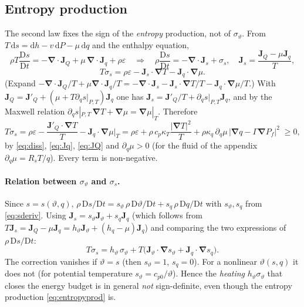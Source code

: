 \documentclass[11pt,a4paper]{article}
\newcommand{\vt}{\vartheta}                    %
\newcommand{\hth}{{h_{\vartheta}}}               %
\newcommand{\hq}{{h_q}}                          %
\newcommand{\bJ}{\mathbf{J}}
\newcommand{\bnabla}{\boldsymbol{\nabla}}
\begin{document}
\subsection{Entropy production}\label{sec:entropy}
The second law fixes the sign of the \emph{entropy} production, not of $\sigma_\vt$. From $T\,\mathrm{d}s=\mathrm{d}h-v\,\mathrm{d}P-\mu\,\mathrm{d}q$ and the enthalpy equation,
\begin{equation}
  \rho T\frac{\mathrm{D}s}{\mathrm{D}t}=-\bnabla\!\cdot\bJ_Q+\mu\,\bnabla\!\cdot\bJ_q+\rho\varepsilon
  \quad\Longrightarrow\quad
  \rho\frac{\mathrm{D}s}{\mathrm{D}t}=-\bnabla\!\cdot\bJ_s+\sigma_s,\quad
  \bJ_s=\frac{\bJ_Q-\mu\bJ_q}{T},
\end{equation}
\begin{equation}
  T\sigma_s=\rho\varepsilon-\bJ_s\!\cdot\bnabla T-\bJ_q\!\cdot\bnabla\mu .
\end{equation}
(Expand $-\bnabla\!\cdot\bJ_Q/T+\mu\bnabla\!\cdot\bJ_q/T=-\bnabla\!\cdot\bJ_s-\bJ_s\!\cdot\bnabla T/T-\bJ_q\!\cdot\bnabla\mu/T$.)
With $\bJ_Q=\bJ'_Q+(\mu+T\partial_qs|_{P,T})\bJ_q$ one has $\bJ_s=\bJ'_Q/T+\partial_qs|_{P,T}\bJ_q$, and by the Maxwell relation
$\partial_qs|_{P,T}\,\bnabla T+\bnabla\mu=\bnabla\mu|_T$. Therefore
\begin{equation}
  T\sigma_s=\rho\varepsilon-\frac{\bJ'_Q\!\cdot\bnabla T}{T}-\bJ_q\!\cdot\bnabla\mu|_T
  =\rho\varepsilon+\rho\,c_p\kappa_T\frac{|\bnabla T|^2}{T}+\rho\kappa_q\,\partial_q\mu\,\big|\bnabla q-\Gamma\bnabla P_f\big|^2\;\ge 0,
  \label{eq:entropyprod}
\end{equation}
by \eqref{eq:diss}, \eqref{eq:Jq}, \eqref{eq:JQ} and $\partial_q\mu>0$ (for the fluid of the appendix $\partial_q\mu=R_sT/q$). Every term is non-negative.

\paragraph{Relation between $\sigma_\vt$ and $\sigma_s$.}
Since $s=s(\vt,q)$, $\rho\,\mathrm{D}s/\mathrm{D}t=s_\vt\,\rho\,\mathrm{D}\vt/\mathrm{D}t+s_q\,\rho\,\mathrm{D}q/\mathrm{D}t$ with $s_\vt,s_q$ from \eqref{eq:sderiv}. Using
$\bJ_s=s_\vt\bJ_\vt+s_q\bJ_q$ (which follows from $T\bJ_s=\bJ_Q-\mu\bJ_q=\hth\bJ_\vt+(\hq-\mu)\bJ_q$) and comparing the two expressions of $\rho\,\mathrm{D}s/\mathrm{D}t$:
\begin{equation}
  T\sigma_s=\hth\,\sigma_\vt+T\big(\bJ_\vt\!\cdot\bnabla s_\vt+\bJ_q\!\cdot\bnabla s_q\big).
  \label{eq:sigmarel}
\end{equation}
The correction vanishes if $\vt=s$ (then $s_\vt=1$, $s_q=0$). For a nonlinear $\vt(s,q)$ it does not (for potential temperature $s_\vt=c_{p0}/\vt$). Hence the \emph{heating} $\hth\sigma_\vt$ that closes the energy budget is in general
\emph{not} sign-definite, even though the entropy production \eqref{eq:entropyprod} is.
\end{document}
